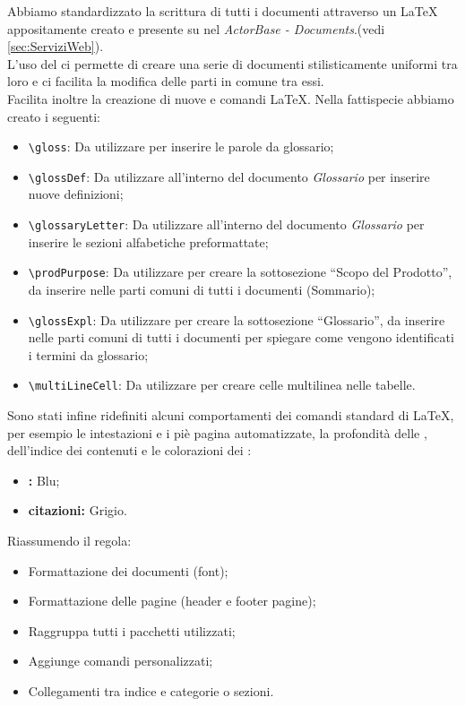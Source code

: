 \documentclass{scalatekids-article}
\begin{document}
\label{sec:strutturadoc}
Abbiamo standardizzato la scrittura di tutti i documenti attraverso un
 \LaTeX\xspace appositamente creato e presente su
\textit{} nel  \textit{ActorBase -
Documents}.(vedi \ref{sec:ServiziWeb}).\\ L'uso del  ci permette di creare una serie di documenti
stilisticamente uniformi tra loro e ci facilita la modifica delle parti in
comune tra essi.\\Facilita inoltre la creazione di nuove  e comandi
\LaTeX\xspace. Nella fattispecie abbiamo creato i seguenti:
\begin{itemize}
    \item\verb=\gloss=: Da utilizzare per inserire le parole da glossario;
    \item\verb=\glossDef=: Da utilizzare all'interno del documento \textit{Glossario} per inserire nuove definizioni;
    \item\verb=\glossaryLetter=: Da utilizzare all'interno del documento \textit{Glossario} per inserire le sezioni alfabetiche preformattate;
    \item\verb=\prodPurpose=: Da utilizzare per creare la sottosezione ``Scopo del Prodotto'', da inserire nelle parti comuni di tutti i documenti (Sommario);
    \item\verb=\glossExpl=: Da utilizzare per creare la sottosezione ``Glossario'', da inserire nelle parti comuni di tutti i documenti per spiegare come vengono identificati i termini da glossario;
    \item\verb=\multiLineCell=: Da utilizzare per creare celle multilinea nelle tabelle.
\end{itemize}
Sono stati infine ridefiniti alcuni comportamenti dei comandi standard di
\LaTeX\xspace, per esempio le intestazioni e i piè pagina automatizzate, la
profondità delle , dell'indice dei contenuti e le colorazioni dei
:
\begin{itemize}
    \item\textbf{:} Blu;
    \item\textbf{citazioni:} Grigio.
\end{itemize}
Riassumendo il  regola:
\begin{itemize}
    \item Formattazione dei documenti (font);
    \item Formattazione delle pagine (header e footer pagine);
    \item Raggruppa tutti i pacchetti utilizzati;
    \item Aggiunge comandi personalizzati;
    \item Collegamenti tra indice e categorie o sezioni.
\end{itemize}
\end{document}
